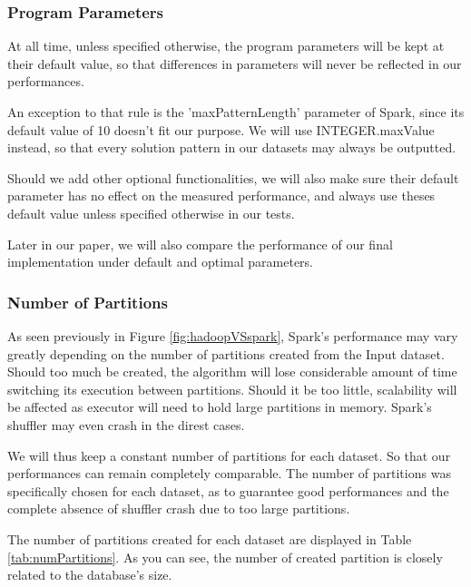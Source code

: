 \documentclass{eplmastersthesis}
\begin{document}
\subsubsection{Program Parameters}

At all time, unless specified otherwise, the program parameters will be kept at their default value, so that differences in parameters will never be reflected in our performances.\newline

An exception to that rule is the 'maxPatternLength' parameter of Spark, since its default value of 10 doesn't fit our purpose. We will use INTEGER.maxValue instead, so that every solution pattern in our datasets may always be outputted.\newline

Should we add other optional functionalities, we will also make sure their default parameter has no effect on the measured performance, and always use theses default value unless specified otherwise in our tests. \newline

Later in our paper, we will also compare the performance of our final implementation under default and optimal parameters.

\subsubsection{Number of Partitions}

As seen previously in Figure \ref{fig:hadoopVSspark}, Spark's performance may vary greatly depending on the number of partitions created from the Input dataset. Should too much be created, the algorithm will lose considerable amount of time switching its execution between partitions. Should it be too little, scalability will be affected as executor will need to hold large partitions in memory. Spark's shuffler may even crash in the direst cases. \newline

We will thus keep a constant number of partitions for each dataset. So that our performances can remain completely comparable. The number of partitions was specifically chosen for each dataset, as to guarantee good performances and the complete absence of shuffler crash due to too large partitions. \newline

The number of partitions created for each dataset are displayed in Table \ref{tab:numPartitions}. As you can see, the number of created partition is closely related to the database's size.
\end{document}
